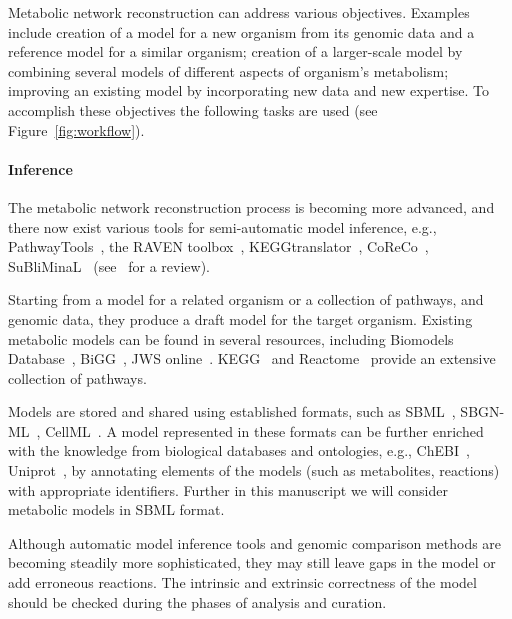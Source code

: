 \documentclass{bmcart}
\begin{document}
Metabolic network reconstruction can address various objectives. Examples include creation of a model for a new organism from its genomic data and a reference model for a similar organism; creation of a larger-scale model by combining several models of different aspects of organism's metabolism; improving an existing model by incorporating new data and new expertise. To accomplish these objectives the following tasks are used (see Figure~\ref{fig:workflow}). 

\paragraph{Inference}

The metabolic network reconstruction process is becoming more advanced, and there now exist various tools for semi-automatic model inference, e.g., PathwayTools~\cite{Karp2002}, the RAVEN toolbox~\cite{Agren2013}, KEGGtranslator~\cite{Wrzodek2013}, CoReCo~\cite{Pitkanen2014}, SuBliMinaL~\cite{Swainston2011} (see~\cite{Hamilton2014} for a review).

Starting from a model for a related organism or a collection of pathways, and genomic data, they produce a draft model for the target organism. Existing metabolic models can be found in several resources, including Biomodels Database~\cite{Li10}, BiGG~\cite{Schellenberger2010}, JWS online~\cite{Snoep2003}. KEGG~\cite{Kanehisa12} and Reactome~\cite{Milacic2012, Croft2013} provide an extensive collection of pathways. 

Models are stored and shared using established formats, such as SBML~\cite{Hucka2003}, SBGN-ML~\cite{VanIersel2012}, CellML~\cite{Lloyd2004}. A model represented in these formats can be further enriched with the knowledge from biological databases and ontologies, e.g., ChEBI~\cite{deMatos10}, Uniprot~\cite{TheUniProtConsortium2014}, by annotating elements of the models (such as metabolites, reactions) with appropriate identifiers. Further in this manuscript we will consider metabolic models in SBML format.

Although automatic model inference tools and genomic comparison methods are becoming steadily more sophisticated, they may still leave gaps in the model or add erroneous reactions. The intrinsic and extrinsic correctness of the model should be checked during the phases of analysis and curation.
\end{document}
